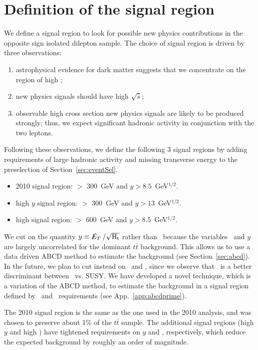 \section{Definition of the signal region}
\label{sec:sigregion}

We define a signal region to look for possible
new physics contributions in the opposite sign isolated 
dilepton sample. The choice of signal region is driven by 
three observations:
\begin{enumerate}
\item astrophysical evidence for dark matter suggests that
we concentrate on the region of high \met;
\item new physics signals should have high $\sqrt{\hat{s}}$;
\item observable high cross section new physics signals 
are likely to be produced strongly;  thus, we expect significant
hadronic activity in conjunction with the two leptons.
\end{enumerate}

Following these observations, we define the following 3 signal regions by 
adding requirements of large hadronic activity and missing transverse energy 
to the preselection of Section~\ref{sec:eventSel}. 
\begin{itemize}
\item 2010 signal region: \Ht $>$ 300~GeV and $y > 8.5$~GeV$^{1/2}$.
\item high $y$ signal region: \Ht $>$ 300~GeV and $y > 13$~GeV$^{1/2}$.
\item high \Ht signal region: \Ht $>$ 600~GeV and $y > 8.5$~GeV$^{1/2}$.
\end{itemize}

We cut on the quantity $y \equiv \met/\sqrt{\rm H_t}$ rather than \met\
because the variables \Ht\ and $y$ are
largely uncorrelated for the dominant $t\bar{t}$ background.  
This allows us to use a data driven ABCD method to estimate the
background (see Section~\ref{sec:abcd}). In the future, we plan to cut instead
on \met\ and \Ht, since we observe that \met\ is a better discriminant between
\ttbar\ vs. SUSY. We have developed a novel technique, which is a variation of 
the ABCD method, to estimate the background in a signal region defined by
\met\ and \Ht\ requirements (see App.~\ref{app:abcdprime}).

The 2010 signal region is the same as the one used in the 2010 analysis, and was
chosen to preserve about 1\% of the $t\bar{t}$ sample.
The additional signal regions (high $y$ and high \Ht) have tightened requirements
on $y$ and \Ht, respectively, which reduce the expected background by roughly
an order of magnitude.


